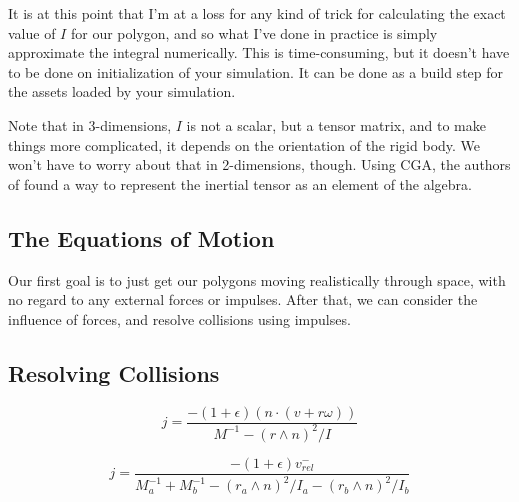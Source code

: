 \documentclass[12pt]{article}
\begin{document}
It is at this point that I'm at a loss for any kind of trick for calculating the exact value of $I$ for our polygon, and so
what I've done in practice is simply approximate the integral numerically.  This is time-consuming, but it doesn't have
to be done on initialization of your simulation.  It can be done as a build step for the assets loaded by your
simulation.

Note that in 3-dimensions, $I$ is not a scalar, but a tensor matrix, and to make things more complicated, it
depends on the orientation of the rigid body.  We won't have to worry about that in 2-dimensions, though.
Using CGA, the authors of \cite{} found a way to represent the inertial tensor as an element of the algebra.

\subsection{The Equations of Motion}


Our first goal is to just get our polygons moving realistically through space, with no regard to any external forces or impulses.
After that, we can consider the influence of forces, and resolve collisions using impulses.



\subsection{Resolving Collisions}

\begin{equation}
j = \frac{-(1+\epsilon)(n\cdot (v + r\omega))}{M^{-1}-(r\wedge n)^2/I}
\end{equation}

\begin{equation}
j = \frac{-(1+\epsilon)v_{rel}^{-}}{M_a^{-1}+M_b^{-1}-(r_a\wedge n)^2/I_a - (r_b\wedge n)^2/I_b}
\end{equation}
\end{document}
